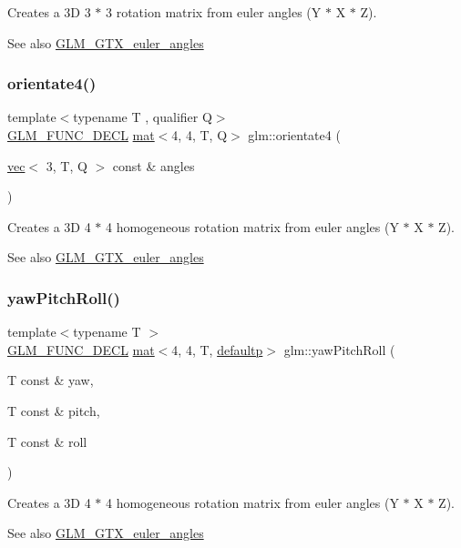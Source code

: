 Creates a 3D 3 $\ast$ 3 rotation matrix from euler angles (Y $\ast$ X $\ast$ Z). \begin{DoxySeeAlso}{See also}
\hyperlink{group__gtx__euler__angles}{G\+L\+M\+\_\+\+G\+T\+X\+\_\+euler\+\_\+angles} 
\end{DoxySeeAlso}
\mbox{\label{group__gtx__euler__angles_ga4a044653f71a4ecec68e0b623382b48a}} 
\subsubsection{\texorpdfstring{orientate4()}{orientate4()}}
{\footnotesize\ttfamily template$<$typename T , qualifier Q$>$ \\
\hyperlink{setup_8hpp_ab2d052de21a70539923e9bcbf6e83a51}{G\+L\+M\+\_\+\+F\+U\+N\+C\+\_\+\+D\+E\+CL} \hyperlink{structglm_1_1mat}{mat}$<$4, 4, T, Q$>$ glm\+::orientate4 (\begin{DoxyParamCaption}\item[{\hyperlink{structglm_1_1vec}{vec}$<$ 3, T, Q $>$ const \&}]{angles }\end{DoxyParamCaption})}

Creates a 3D 4 $\ast$ 4 homogeneous rotation matrix from euler angles (Y $\ast$ X $\ast$ Z). \begin{DoxySeeAlso}{See also}
\hyperlink{group__gtx__euler__angles}{G\+L\+M\+\_\+\+G\+T\+X\+\_\+euler\+\_\+angles} 
\end{DoxySeeAlso}
\mbox{\label{group__gtx__euler__angles_gae6aa26ccb020d281b449619e419a609e}} 
\subsubsection{\texorpdfstring{yaw\+Pitch\+Roll()}{yawPitchRoll()}}
{\footnotesize\ttfamily template$<$typename T $>$ \\
\hyperlink{setup_8hpp_ab2d052de21a70539923e9bcbf6e83a51}{G\+L\+M\+\_\+\+F\+U\+N\+C\+\_\+\+D\+E\+CL} \hyperlink{structglm_1_1mat}{mat}$<$4, 4, T, \hyperlink{namespaceglm_a36ed105b07c7746804d7fdc7cc90ff25a9d21ccd8b5a009ec7eb7677befc3bf51}{defaultp}$>$ glm\+::yaw\+Pitch\+Roll (\begin{DoxyParamCaption}\item[{T const \&}]{yaw,  }\item[{T const \&}]{pitch,  }\item[{T const \&}]{roll }\end{DoxyParamCaption})}

Creates a 3D 4 $\ast$ 4 homogeneous rotation matrix from euler angles (Y $\ast$ X $\ast$ Z). \begin{DoxySeeAlso}{See also}
\hyperlink{group__gtx__euler__angles}{G\+L\+M\+\_\+\+G\+T\+X\+\_\+euler\+\_\+angles} 
\end{DoxySeeAlso}
